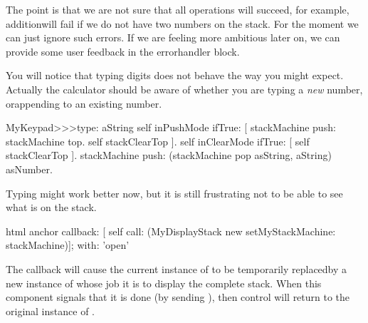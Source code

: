 \documentclass[a4paper,10pt,twoside]{book}
\begin{document}
The point is that we are not sure that all operations will succeed, for example, additionwill fail if we do not have two numbers on the stack.
For the moment we can just ignore such errors.
If we are feeling more ambitious later on, we can provide some user feedback in the errorhandler block.


You will notice that typing digits does not behave the way you might expect.
Actually the calculator should be aware of whether you are typing a \emph{new} number, orappending to an existing number.


\begin{code}{}
MyKeypad>>>type: aString
	self inPushMode ifTrue: [
		stackMachine push: stackMachine top.
		self stackClearTop ].
	self inClearMode ifTrue: [ self stackClearTop ].
	stackMachine push: (stackMachine pop asString, aString) asNumber.
\end{code}

Typing might work better now, but it is still frustrating not to be able to see what is
on the stack.


\begin{code}{}
html anchor
	callback: [ self call: (MyDisplayStack new setMyStackMachine: stackMachine)];
	with: 'open'
\end{code}

The callback will cause the current instance of  to be temporarily replacedby a new instance of  whose job it is to display the complete stack.
When this component signals that it is done (\ie by sending ), then
control will return to the original instance of .
\end{document}
